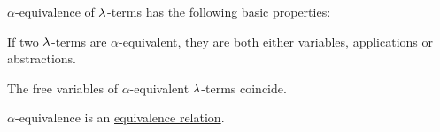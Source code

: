 \begin{proposition}\label{thm:def:lambda_term_alpha_equivalence}
  \hyperref[def:lambda_term_alpha_equivalence]{\( \alpha \)-equivalence} of \( \mathrm{\lambda} \)-terms has the following basic properties:
  \begin{thmenum}
     If two \( \mathrm{\lambda} \)-terms are \( \alpha \)-equivalent, they are both either variables, applications or abstractions.

     The free variables of \( \alpha \)-equivalent \( \mathrm{\lambda} \)-terms coincide.

     \( \alpha \)-equivalence is an \hyperref[def:equivalence_relation]{equivalence relation}.
  \end{thmenum}
\end{proposition}
